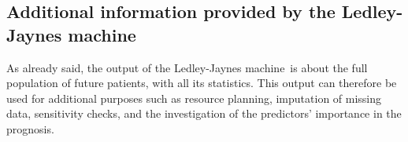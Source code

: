 \documentclass[utf8]{FrontiersinHarvard} %
\renewcommand*{\|}[1][]{\nonscript\:#1\vert\nonscript\:\mathopen{}}
\newcommand*{\ljm}{Ledley-Jaynes machine}
\begin{document}


 




\newpage%
\subsection{Additional information provided by the \ljm}
\label{sec:additional_results}

As already said, the output of the \ljm\ is about the full population of future patients, with all its statistics. This output can therefore be used for additional purposes such as resource planning, imputation of missing data, sensitivity checks, and the investigation of the predictors' importance in the prognosis.
\end{document}
